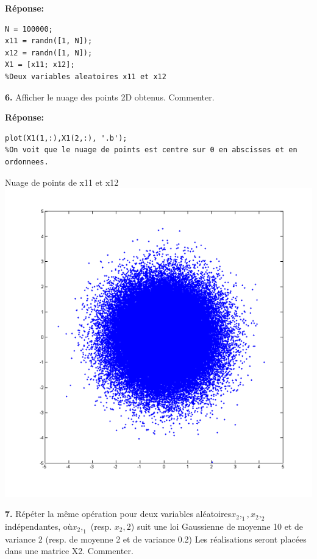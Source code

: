 \documentclass[12pt]{article}
\begin{document}
\smallbreak
\textbf{Réponse:}
\begin{lstlisting}[style=Matlab-editor]
N = 100000;
x11 = randn([1, N]);
x12 = randn([1, N]);
X1 = [x11; x12];
%Deux variables aleatoires x11 et x12
\end{lstlisting}
\smallbreak

\textbf{6. }Afficher le nuage des points 2D obtenus. Commenter.

\smallbreak
\textbf{Réponse:}
\begin{lstlisting}[style=Matlab-editor]
plot(X1(1,:),X1(2,:), '.b');
%On voit que le nuage de points est centre sur 0 en abscisses et en ordonnees.
\end{lstlisting}

\clearpage

\begin{flushleft}
Nuage de points de x11 et x12
\includegraphics{2_6_100000.PNG}
\end{flushleft}

\smallbreak

\textbf{7. }Répéter la même opération pour deux variables aléatoires$ x_2,_1 , x_2,_2$ indépendantes, où$ x_2,_1$ (resp. $x_2,2$) suit une loi Gaussienne de moyenne 10 et de variance 2 (resp. de moyenne 2 et de variance 0.2) Les réalisations seront placées dans une matrice X2. Commenter.
\end{document}
